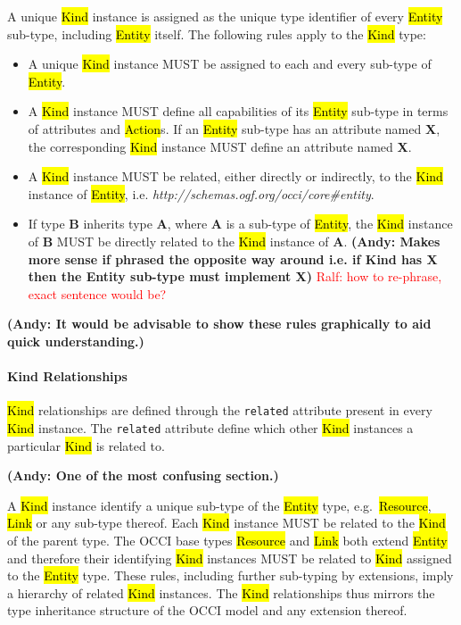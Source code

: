 \documentclass[10pt,a4paper]{article}
\newcommand{\ralf}[1]{\textcolor{red}{Ralf: #1}}
\begin{document}
A unique \hl{Kind} instance is assigned as the unique type identifier of every
\hl{Entity} sub-type, including \hl{Entity} itself. The following rules apply
to the \hl{Kind} type:
\begin{itemize}
\item A unique \hl{Kind} instance MUST be assigned to each and every sub-type
 of \hl{Entity}.
\item A \hl{Kind} instance MUST define all capabilities of its \hl{Entity}
 sub-type in terms of attributes and \hl{Action}s. If an \hl{Entity} sub-type
 has an attribute named {\bf X}, the corresponding \hl{Kind} instance MUST define
 an attribute named {\bf X}.
\item A \hl{Kind} instance MUST be related, either directly or indirectly, to
 the \hl{Kind} instance of \hl{Entity},
 i.e. \textit{http://schemas.ogf.org/occi/core\#entity}.
\item If type {\bf B} inherits type {\bf A}, where {\bf A} is a sub-type of
 \hl{Entity}, the \hl{Kind} instance of {\bf B} MUST be directly related to the
 \hl{Kind} instance of {\bf A}. \textbf{(Andy: Makes more sense if phrased 
 the opposite way around i.e. if Kind has X then the Entity sub-type must implement X)}
 \ralf{how to re-phrase, exact sentence would be?}
\end{itemize}

\textbf{(Andy: It would be advisable to show these rules graphically to aid quick understanding.)}

\paragraph*{Kind Relationships}
\label{sec:kind_relationship}
\hl{Kind} relationships are defined through the {\tt related} attribute present
in every \hl{Kind} instance. The {\tt related} attribute define which other
\hl{Kind} instances a particular \hl{Kind} is related to.

\textbf{(Andy: One of the most confusing section.)}

A \hl{Kind} instance identify a unique sub-type of the \hl{Entity} type,
e.g.~\hl{Resource}, \hl{Link} or any sub-type thereof.  Each \hl{Kind} instance
MUST be related to the \hl{Kind} of the parent type.
%
The OCCI base types \hl{Resource} and \hl{Link} both extend \hl{Entity} and
therefore their identifying \hl{Kind} instances MUST be related to \hl{Kind}
assigned to the \hl{Entity} type.
%
These rules, including further sub-typing by extensions, imply a hierarchy of
related \hl{Kind} instances. The \hl{Kind} relationships thus mirrors the type
inheritance structure of the OCCI model and any extension thereof.
\end{document}
